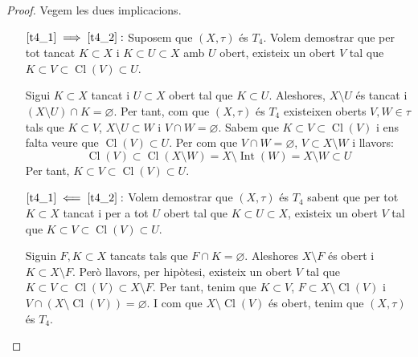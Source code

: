 \documentclass[10pt,a4paper]{article}
\theoremstyle{definition}
\DeclareMathOperator{\Cl}{Cl} %
\DeclareMathOperator{\Int}{Int} %
\begin{document}
\begin{proof}
      Vegem les dues implicacions.
      \begin{itemize}[leftmargin=2cm]
            \item [$\ref{t4_1}\implies \ref{t4_2}:$] Suposem que $(X,\tau)$ és $T_4$. Volem demostrar que per tot tancat $K\subset X$ i $K\subset U \subset X$ amb $U$ obert, existeix un obert $V$ tal que $K\subset V \subset \Cl(V) \subset U$.

                  Sigui $K\subset X$ tancat i $U\subset X$ obert tal que $K\subset U$. Aleshores, $X\setminus U$ és tancat i $(X\setminus U)\cap K=\varnothing$. Per tant, com que $(X,\tau)$ és $T_4$ existeixen oberts $V,W\in\tau$ tals que $K\subset V$, $X\setminus U\subset W$ i $V\cap W=\varnothing$. Sabem que $K\subset V \subset \Cl(V)$ i ens falta veure que $\Cl(V) \subset U$. Per com que $V\cap W=\varnothing$, $V\subset X\setminus W$ i llavors: $$\Cl(V)\subset \Cl(X\setminus W)=X\setminus \Int(W)=X\setminus W\subset U$$
                  Per tant, $K\subset V \subset \Cl(V) \subset U$.
            \item [$\ref{t4_1}\impliedby \ref{t4_2}:$] Volem demostrar que $(X,\tau)$ és $T_4$ sabent que per tot $K\subset X$ tancat i per a tot $U$ obert tal que $K\subset U \subset X$, existeix un obert $V$ tal que $K\subset V \subset \Cl(V) \subset U$.

                  Siguin $F,K\subset X$ tancats tals que $F\cap K=\varnothing$. Aleshores $X\setminus F$ és obert i $K\subset X\setminus F$. Però llavors, per hipòtesi, existeix un obert $V$ tal que $K\subset V\subset \Cl(V)\subset X\setminus F$. Per tant, tenim que $K\subset V$, $F\subset X\setminus \Cl(V)$ i $V\cap(X\setminus\Cl(V))=\varnothing$. I com que $X\setminus\Cl(V)$ és obert, tenim que $(X,\tau)$ és $T_4$.

      \end{itemize}
\end{proof}
\end{document}
